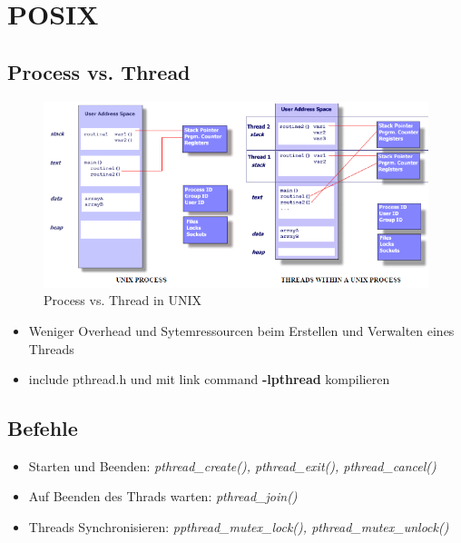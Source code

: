 \section{POSIX}
\subsection{Process vs. Thread}
\begin{figure}[h!]
    \centering
    \includegraphics[width=0.8\linewidth]{images/Posix/Posix_Process_vs_Thread}
    \caption{Process vs. Thread in UNIX}
    \label{fig:posix:ProcessVsThread}
\end{figure}
\begin{itemize}
    \item Weniger Overhead und Sytemressourcen beim Erstellen und Verwalten eines Threads
    \item include pthread.h und mit link command \textbf{-lpthread} kompilieren
\end{itemize}
\subsection{Befehle}
\begin{itemize}
    \item Starten und Beenden: \textit{pthread\_create(), pthread\_exit(), pthread\_cancel()}
    \item Auf Beenden des Thrads warten: \textit{pthread\_join()}
    \item Threads Synchronisieren: \textit{ppthread\_mutex\_lock(), pthread\_mutex\_unlock()}
\end{itemize}
